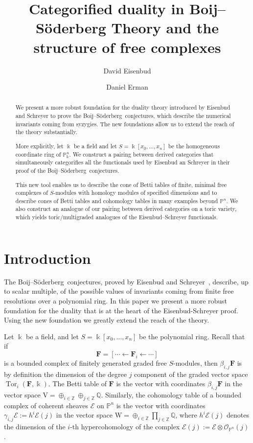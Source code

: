 \documentclass[12pt]{amsart}
\title{Categorified duality in Boij--S\"oderberg Theory and the structure of free complexes}
\author{David Eisenbud}
\author{Daniel Erman}\thanks{The first author was partially supported by an NSF grant, and the second author was partially supported by an NSF fellowship and by a Simons Foundation fellowship.}
\theoremstyle{definition}
\theoremstyle{remark}
\newcommand{\Tor}{\operatorname{Tor}}
\newcommand{\kk}{\Bbbk}
\newcommand{\PP}{\mathbb{P}}
\newcommand{\ZZ}{\mathbb{Z}}
\newcommand{\QQ}{\mathbb{Q}}
\newcommand{\VV}{\mathrm{V}}
\newcommand{\WW}{\mathrm{W}}
\newcommand{\cO}{\mathcal{O}}
\newcommand{\cE}{\mathcal{E}}
\newcommand{\FF}{\mathbf{F}}
\newcommand{\defi}[1]{\textsf{#1}} %
\def\BS{Boij--S\"oderberg~}
\begin{document}
\begin{abstract} We present a more robust foundation for the duality theory introduced by Eisenbud and Schreyer to prove the \BS conjectures, which describe the numerical invariants coming from syzygies.
The new foundations allow us to extend the reach of the theory substantially.

More explicitly, let $\kk$ be a field and let $S = \kk[x_{0}, \dots,x_{n}]$ be the homogeneous coordinate ring of $\PP^{n}_{\kk}$.
We construct a pairing between derived categories that
simultaneously categorifies all the functionals used by Eisenbud an Schreyer in their proof of the \BS conjectures.

This new tool enables us to describe the cone of Betti tables of finite, minimal free complexes of $S$-modules with homology modules of specified dimensions and  to describe cones of Betti tables and cohomology tables in many examples beyond $\PP^n$. We also construct an analogue of our pairing between derived categories on a toric variety, which yields toric/multigraded analogues of the Eisenbud--Schreyer functionals.
\end{abstract}

\maketitle

\tableofcontents


\section*{Introduction}
The \BS conjectures, proved by Eisenbud and Schreyer~\cite{eis-schrey1}, describe, up to scalar multiple, of the possible values of invariants coming from finite free resolutions over a polynomial ring. In this paper we present a more robust foundation for the duality that is at the heart of the Eisenbud-Schreyer proof. Using the new foundation we greatly extend the reach of the theory.

Let $\kk$ be a field, and let $S=\kk[x_0, \dots, x_n]$ be the polynomial ring. Recall that if 
$$
\FF= [\cdots \gets \FF_i \gets \cdots ]
$$
is a bounded complex of finitely generated graded free $S$-modules, then $\beta_{i,j}\FF$ is by definition the dimension of the degree $j$ component of the graded vector space $\Tor_i(\FF,\kk)$.  The \defi{Betti table} of $\FF$ is the vector with coordinates $\beta_{i,j}\FF$ in the vector space $\VV = \oplus_{i\in \ZZ} \oplus_{j\in \ZZ}\QQ$. Similarly, the \defi{cohomology table} of a bounded complex of coherent sheaves $\cE$ on $\PP^{n}$ is the vector with coordinates $\gamma_{i,j}\cE := h^{i}\cE(j)$ in the vector space $\WW = \oplus_{i\in \ZZ}\prod_{j\in \ZZ}\QQ$, where $h^{i}\cE(j)$ denotes the dimension of the $i$-th hypercohomology of the complex $\cE(j) := \cE \otimes \cO_{\PP^{n}}(j)$. 
\end{document}
